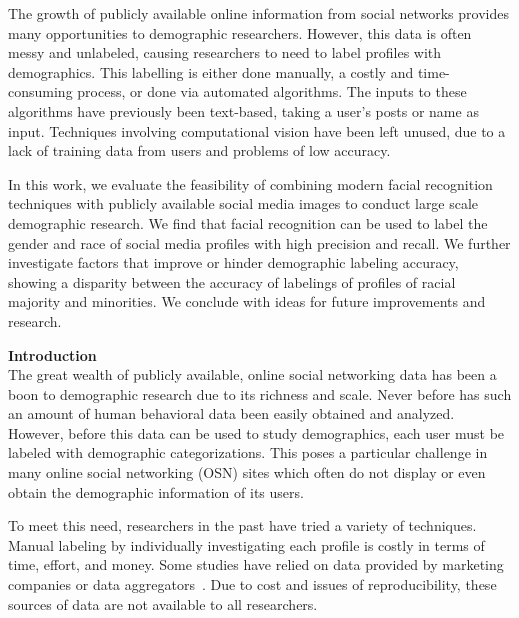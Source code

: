 
The growth of publicly available online information from social networks provides many opportunities to demographic researchers.
However, this data is often messy and unlabeled, causing researchers to need to label profiles with demographics.
This labelling is either done manually, a costly and time-consuming process, or done via automated algorithms.
The inputs to these algorithms have previously been text-based, taking a user's posts or name as input.
Techniques involving computational vision have been left unused, due to a lack of training data from users and problems of low accuracy.

In this work, we evaluate the feasibility of combining modern facial recognition techniques with publicly available social media images to conduct large scale demographic research.
We find that facial recognition can be used to label the gender and race of social media profiles with high precision and recall.
We further investigate factors that improve or hinder demographic labeling accuracy, showing a disparity between the accuracy of labelings of profiles of racial majority and minorities.
We conclude with ideas for future improvements and research.


\textbf{Introduction} \\
The great wealth of publicly available, online social networking data has been a boon to demographic research due to its richness and scale.
Never before has such an amount of human behavioral data been easily obtained and analyzed.
However, before this data can be used to study demographics, each user must be labeled with demographic categorizations. 
This poses a particular challenge in many online social networking (OSN) sites which often do not display or even obtain the demographic information of its users.

To meet this need, researchers in the past have tried a variety of techniques.
Manual labeling by individually investigating each profile is costly in terms of time, effort, and money.
Some studies have relied on data provided by marketing companies or data aggregators~\cite{Goel:2012ut, biinferring}.
Due to cost and issues of reproducibility, these sources of data are not available to all researchers.

